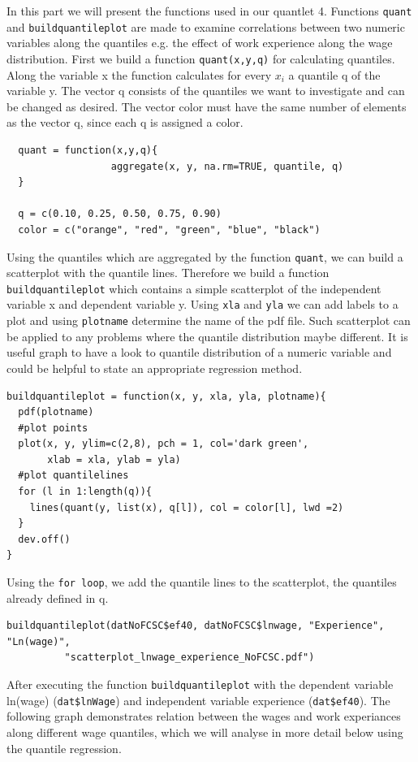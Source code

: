 In this part we will present the functions used in our quantlet 4. Functions \texttt{quant} and \texttt{buildquantileplot} are made to examine correlations between two numeric variables along the quantiles e.g. the effect of work experience along the wage distribution. First we build a function \texttt{quant(x,y,q)} for calculating quantiles. Along the variable x the function calculates for every $x_{i}$ a quantile q of the variable y. The vector q consists of the quantiles we want to investigate and can be changed as desired. The vector color must have the same number of elements as the vector q, since each q is assigned a color.
\lstset{firstnumber = 255}
\begin{lstlisting}
  quant = function(x,y,q){
                  aggregate(x, y, na.rm=TRUE, quantile, q)
  }

  q = c(0.10, 0.25, 0.50, 0.75, 0.90)
  color = c("orange", "red", "green", "blue", "black")
\end{lstlisting}
Using the quantiles which are aggregated by the function \texttt{quant}, we can build a scatterplot with the quantile lines. Therefore we build a function \texttt{buildquantileplot} which contains a simple scatterplot of the independent variable x and dependent variable y. Using \texttt{xla} and \texttt{yla} we can add labels to a plot and using \texttt{plotname} determine the name of the pdf file. Such scatterplot can be applied to any problems where the quantile distribution maybe different. It is  useful graph to have a look to quantile distribution of a numeric variable and could be helpful to state an appropriate regression method.
\lstset{firstnumber = 277}
\begin{lstlisting}
buildquantileplot = function(x, y, xla, yla, plotname){
  pdf(plotname)
  #plot points
  plot(x, y, ylim=c(2,8), pch = 1, col='dark green',
       xlab = xla, ylab = yla)
  #plot quantilelines
  for (l in 1:length(q)){
    lines(quant(y, list(x), q[l]), col = color[l], lwd =2)
  }
  dev.off()
}
\end{lstlisting}
Using the \texttt{for loop}, we add the quantile lines to the scatterplot, the quantiles already defined in q.
\lstset{firstnumber = 303}
\begin{lstlisting}
buildquantileplot(datNoFCSC$ef40, datNoFCSC$lnwage, "Experience", "Ln(wage)",
		  "scatterplot_lnwage_experience_NoFCSC.pdf")
\end{lstlisting}
After executing the function \texttt{buildquantileplot} with the dependent variable ln(wage) (\texttt{dat\$lnWage}) and independent variable experience (\texttt{dat\$ef40}). The following graph demonstrates relation between the wages and work experiances along different wage quantiles, which we will analyse in more detail below using the quantile regression.
